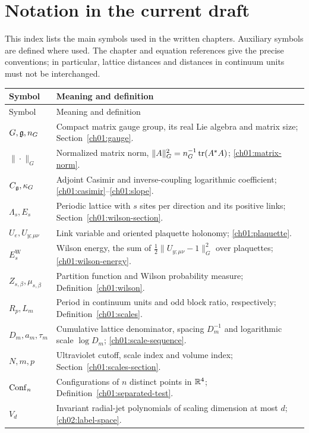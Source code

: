 \chapter{Notation in the current draft}

This index lists the main symbols used in the written chapters.
Auxiliary symbols are defined where used. The chapter and equation
references give the precise conventions; in particular, lattice distances
and distances in continuum units must not be interchanged.

{\small
\begin{longtable}{@{}p{}p{}@{}}
\toprule
Symbol & Meaning and definition \\
\midrule
\endfirsthead
\toprule
Symbol & Meaning and definition \\
\midrule
\endhead
$G,\mathfrak g,n_G$ & Compact matrix gauge group, its real Lie algebra and matrix size; Section~\ref{ch01:gauge}.\\[2pt]
$\|\cdot\|_G$ & Normalized matrix norm, $\|A\|_G^2=n_G^{-1}\operatorname{tr}(A^*A)$; \eqref{ch01:matrix-norm}.\\[2pt]
$C_{\mathfrak g},\kappa_G$ & Adjoint Casimir and inverse-coupling logarithmic coefficient; \eqref{ch01:casimir}--\eqref{ch01:slope}.\\[2pt]
$\Lambda_s,E_s$ & Periodic lattice with $s$ sites per direction and its positive links; Section~\ref{ch01:wilson-section}.\\[2pt]
$U_e,U_{y;\mu\nu}$ & Link variable and oriented plaquette holonomy; \eqref{ch01:plaquette}.\\[2pt]
$E_s^{\mathrm W}$ & Wilson energy, the sum of $\tfrac12\|U_{y;\mu\nu}-1\|_G^2$ over plaquettes; \eqref{ch01:wilson-energy}.\\[2pt]
$Z_{s,\beta},\mu_{s,\beta}$ & Partition function and Wilson probability measure; Definition~\ref{ch01:wilson}.\\[2pt]
$R_p,L_m$ & Period in continuum units and odd block ratio, respectively; Definition~\ref{ch01:scales}.\\[2pt]
$D_m,a_m,\tau_m$ & Cumulative lattice denominator, spacing $D_m^{-1}$ and logarithmic scale $\log D_m$; \eqref{ch01:scale-sequence}.\\[2pt]
$N,m,p$ & Ultraviolet cutoff, scale index and volume index; Section~\ref{ch01:scales-section}.\\[2pt]
$\operatorname{Conf}_n$ & Configurations of $n$ distinct points in $\mathbb R^4$; Definition~\ref{ch01:separated-test}.\\[2pt]
$V_d$ & Invariant radial-jet polynomials of scaling dimension at most $d$; \eqref{ch02:label-space}.\\[2pt]

\end{longtable}}
